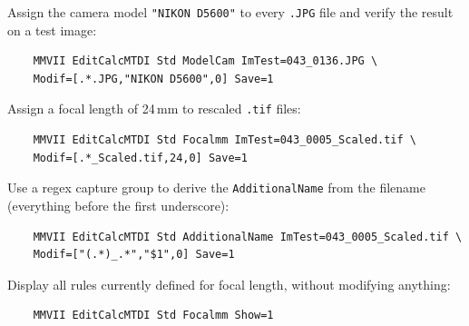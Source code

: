 Assign the camera model {\tt "NIKON D5600"} to every {\tt .JPG} file and verify
the result on a test image:

\begin{lstlisting}
	MMVII EditCalcMTDI Std ModelCam ImTest=043_0136.JPG \
	Modif=[.*.JPG,"NIKON D5600",0] Save=1
\end{lstlisting}

Assign a focal length of 24\,mm to rescaled {\tt .tif} files:

\begin{lstlisting}
	MMVII EditCalcMTDI Std Focalmm ImTest=043_0005_Scaled.tif \
	Modif=[.*_Scaled.tif,24,0] Save=1
\end{lstlisting}

Use a regex capture group to derive the {\tt AdditionalName} from the filename
(everything before the first underscore):

\begin{lstlisting}
	MMVII EditCalcMTDI Std AdditionalName ImTest=043_0005_Scaled.tif \
	Modif=["(.*)_.*","$1",0] Save=1
\end{lstlisting}

Display all rules currently defined for focal length, without modifying anything:

\begin{lstlisting}
	MMVII EditCalcMTDI Std Focalmm Show=1
\end{lstlisting}

